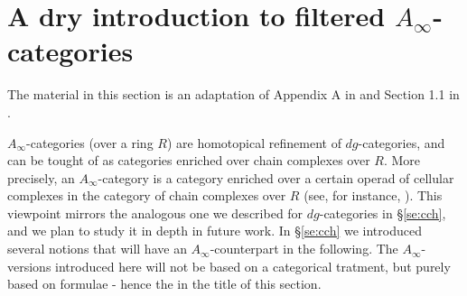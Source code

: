 



\section{A dry introduction to filtered $A_\infty$-categories}\label{se:Ainf}\label{a:fil-ai}

The material in this section is an adaptation of Appendix A in \cite{ABC26} and Section 1.1 in \cite{Amb:fil-fuk}.

$A_\infty$-categories (over a ring $R$) are homotopical refinement of $dg$-categories, and can be tought of as categories  enriched over chain complexes over $R$. More precisely, an $A_\infty$-category is a category enriched over a certain operad of cellular complexes in the category of chain complexes over $R$ (see, for instance, \cite{AbouzaidBottman2024Functoriality}). This viewpoint mirrors the analogous one we described for $dg$-categories in \S\ref{se:cch}, and we plan to study it in depth in future work. In \S\ref{se:cch} we introduced several notions that will have an $A_\infty$-counterpart in the following. The $A_\infty$-versions introduced here will not be based on a categorical tratment, but purely based on formulae - hence the  in the title of this section.


